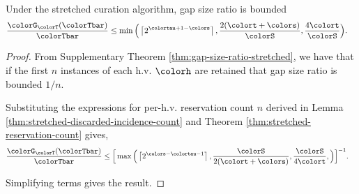 \begin{theorem}
\label{thm:stretched-gap-size}
Under the stretched curation algorithm, gap size ratio is bounded
\begin{align*}
\frac{\colorG_{\colorT}(\colorTbar)}{\colorTbar}
&\leq
\min\Big(
  \left\lceil 2^{\colortau+1-\colors} \right\rceil,
  \frac{2(\colort + \colors)}{\colorS},
  \frac{4\colort}{\colorS}
\Big).
\end{align*}
\end{theorem}
\begin{proof}

From Supplementary Theorem \ref{thm:gap-size-ratio-stretched}, we have that if the first $n$ instances of each h.v. $\colorh$ are retained that gap size ratio is bounded $1/n$.

Substituting the expressions for per-h.v. reservation count $n$ derived in Lemma \ref{thm:stretched-discarded-incidence-count} and Theorem \ref{thm:stretched-reservation-count} gives,
\begin{align*}
  \frac{\colorG_{\colorT}(\colorTbar)}{\colorTbar}
  &\leq
  \Big[
    \max\Big(
      \left\lceil 2^{\colors - \colortau - 1} \right\rceil,
      \frac{\colorS}{2(\colort + \colors)},
      \frac{\colorS}{4\colort},
    \Big)
  \Big]^{-1}.
\end{align*}

Simplifying terms gives the result.

\end{proof}
